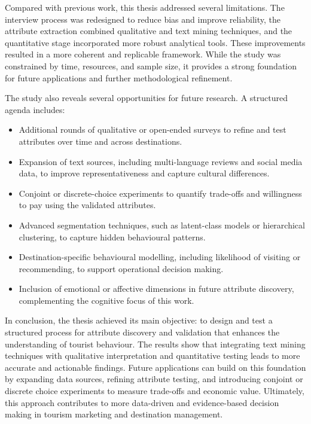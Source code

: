 \documentclass[a4paper, 12pt, twoside]{report}  %
\begin{document}
\indent Compared with previous work, this thesis addressed several limitations. The interview process was redesigned to reduce bias and improve reliability, the attribute extraction combined qualitative and text mining techniques, and the quantitative stage incorporated more robust analytical tools. These improvements resulted in a more coherent and replicable framework. While the study was constrained by time, resources, and sample size, it provides a strong foundation for future applications and further methodological refinement.

\indent The study also reveals several opportunities for future research. A structured agenda includes:

\begin{itemize}
\item Additional rounds of qualitative or open-ended surveys to refine and test attributes over time and across destinations.
\item Expansion of text sources, including multi-language reviews and social media data, to improve representativeness and capture cultural differences.
\item Conjoint or discrete-choice experiments to quantify trade-offs and willingness to pay using the validated attributes.
\item Advanced segmentation techniques, such as latent-class models or hierarchical clustering, to capture hidden behavioural patterns.
\item Destination-specific behavioural modelling, including likelihood of visiting or recommending, to support operational decision making.
\item Inclusion of emotional or affective dimensions in future attribute discovery, complementing the cognitive focus of this work.
\end{itemize}

\indent In conclusion, the thesis achieved its main objective: to design and test a structured process for attribute discovery and validation that enhances the understanding of tourist behaviour. The results show that integrating text mining techniques with qualitative interpretation and quantitative testing leads to more accurate and actionable findings. Future applications can build on this foundation by expanding data sources, refining attribute testing, and introducing conjoint or discrete choice experiments to measure trade-offs and economic value. Ultimately, this approach contributes to more data-driven and evidence-based decision making in tourism marketing and destination management.
\end{document}
